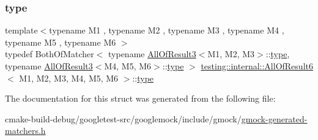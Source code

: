 \subsubsection{\texorpdfstring{type}{type}}
{\footnotesize\ttfamily template$<$typename M1 , typename M2 , typename M3 , typename M4 , typename M5 , typename M6 $>$ \\
typedef Both\+Of\+Matcher$<$ typename \mbox{\hyperlink{structtesting_1_1internal_1_1AllOfResult3}{All\+Of\+Result3}}$<$M1, M2, M3$>$\+::\mbox{\hyperlink{structtesting_1_1internal_1_1AllOfResult6_a5385655911ce2c1d3fccd802c1754139}{type}}, typename \mbox{\hyperlink{structtesting_1_1internal_1_1AllOfResult3}{All\+Of\+Result3}}$<$M4, M5, M6$>$\+::\mbox{\hyperlink{structtesting_1_1internal_1_1AllOfResult6_a5385655911ce2c1d3fccd802c1754139}{type}} $>$ \mbox{\hyperlink{structtesting_1_1internal_1_1AllOfResult6}{testing\+::internal\+::\+All\+Of\+Result6}}$<$ M1, M2, M3, M4, M5, M6 $>$\+::\mbox{\hyperlink{structtesting_1_1internal_1_1AllOfResult6_a5385655911ce2c1d3fccd802c1754139}{type}}}



The documentation for this struct was generated from the following file\+:\begin{DoxyCompactItemize}
\item 
cmake-\/build-\/debug/googletest-\/src/googlemock/include/gmock/\mbox{\hyperlink{gmock-generated-matchers_8h}{gmock-\/generated-\/matchers.\+h}}\end{DoxyCompactItemize}
